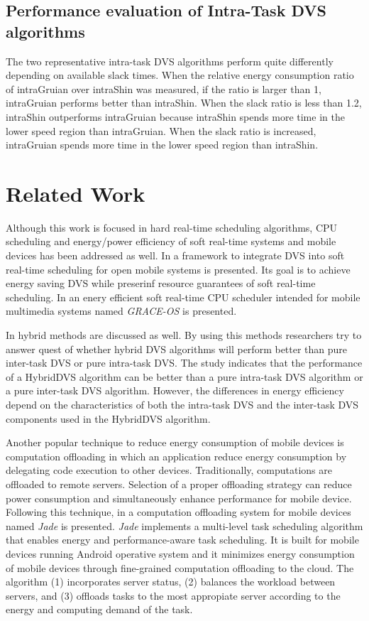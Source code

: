 \documentclass[10pt,article]{IEEEtran}
\begin{document}
\subsection{Performance evaluation of Intra-Task DVS algorithms}
The two representative intra-task DVS algorithms perform quite differently depending on available slack times. When the relative energy consumption ratio of intraGruian over intraShin was measured, if the ratio is larger than 1, intraGruian performs better than intraShin. When  the  slack  ratio  is  less  than  1.2, intraShin outperforms intraGruian because intraShin spends more time in the lower speed region than intraGruian. When the slack ratio is increased, intraGruian spends more time in the lower speed region than intraShin.


\section{Related Work} \label{sec:rel-work}
Although this work is focused in hard real-time scheduling algorithms, CPU scheduling and energy/power efficiency of soft real-time systems and mobile devices has been addressed as well. In \cite{yuan-nahrstedt-1} a framework to integrate DVS into soft real-time scheduling for open mobile systems is presented. Its goal is to achieve energy saving DVS while preserinf resource guarantees of soft real-time scheduling. In \cite{yuan-nahrstedt} an enery efficient soft real-time CPU scheduler intended for mobile multimedia systems named \emph{GRACE-OS} is presented.

In \cite{kim-2} hybrid methods are discussed as well. By using this methods researchers try to answer quest of whether hybrid DVS algorithms will perform better than pure inter-task DVS or pure intra-task DVS. The study indicates that the performance of a HybridDVS algorithm can be better than a pure intra-task DVS algorithm or a pure inter-task DVS algorithm. However, the differences in energy efficiency depend on the characteristics of both the intra-task DVS and the inter-task DVS components used in the HybridDVS algorithm.

Another popular technique to reduce energy consumption of mobile devices is computation offloading in which an application reduce energy consumption by delegating code execution to other devices. Traditionally, computations are offloaded to remote servers. Selection of a proper offloading strategy can reduce power consumption and simultaneously enhance performance for mobile device. Following this technique, in \cite{quian-andresen} a computation offloading system for mobile devices named \emph{Jade} is presented. \emph{Jade} implements a multi-level task scheduling algorithm that enables energy and performance-aware task scheduling. It is built for mobile devices running Android operative system and it minimizes energy consumption of mobile devices through fine-grained computation offloading to the cloud. The algorithm (1) incorporates server status, (2) balances the workload between servers, and (3) offloads tasks to the most appropiate server according to the energy and computing demand of the task.
\end{document}
